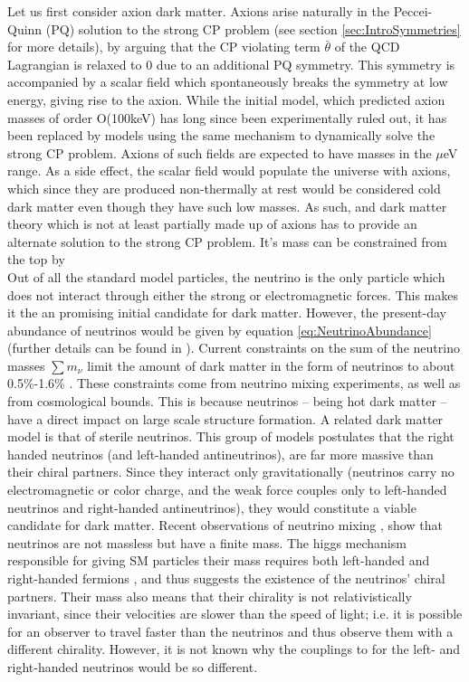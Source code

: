 Let us first consider axion dark matter. Axions arise naturally in the Peccei-Quinn (PQ) solution to the strong CP problem\cite{PQ_axion, Weinberg} (see section \ref{sec:IntroSymmetries} for more details), by arguing that the CP violating term $\bar{\theta}$ of the QCD Lagrangian is relaxed to 0 due to an additional PQ symmetry. This symmetry is accompanied by a scalar field which spontaneously breaks the symmetry at low energy, giving rise to the axion. While the initial model, which predicted axion masses of order O(100keV) has long since been experimentally ruled out, it has been replaced by models using the same mechanism to dynamically solve the strong CP problem. Axions of such fields are expected to have masses in the $\mu$eV range. As a side effect, the scalar field would populate the universe with axions, which since they are produced non-thermally at rest\cite{cookbook} would be considered cold dark matter even though they have such low masses. As such, and dark matter theory which is not at least partially made up of axions has to provide an alternate solution to the strong CP problem. It's mass can be constrained from the top by \\

Out of all the standard model particles, the neutrino is the only particle which does not interact through either the strong or electromagnetic forces. This makes it the an promising initial candidate for dark matter. However, the present-day abundance of neutrinos would be given by equation \ref{eq:NeutrinoAbundance} (further details can be found in \cite{BAER20151}). Current constraints on the sum of the neutrino masses $\sum m_\nu$ limit the amount of dark matter in the form of neutrinos to about 0.5\%-1.6\% \cite{PDG2022}. These constraints come from neutrino mixing experiments, as well as from cosmological bounds. This is because neutrinos -- being hot dark matter -- have a direct impact on large scale structure formation. A related dark matter model is that of sterile neutrinos. This group of models postulates that the right handed neutrinos (and left-handed antineutrinos), are far more massive than their chiral partners. Since they interact only gravitationally (neutrinos carry no electromagnetic or color charge, and the weak force couples only to left-handed neutrinos and right-handed antineutrinos), they would constitute a viable candidate for dark matter\cite{}. Recent observations of neutrino mixing \cite{}, show that neutrinos are not massless but have a finite mass. The higgs mechanism responsible for giving SM particles their mass requires both left-handed and right-handed fermions \cite{}, and thus suggests the existence of the neutrinos' chiral partners. Their mass also means that their chirality is not relativistically invariant, since their velocities are slower than the speed of light; i.e. it is possible for an observer to travel faster than the neutrinos and thus observe them with a different chirality. However, it is not known why the couplings to for the left- and right-handed neutrinos would be so different. \\

